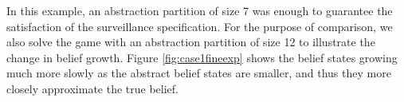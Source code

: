 In this example, an abstraction partition of size 7 was enough to guarantee the satisfaction of the surveillance specification.  For the purpose of comparison, we also solve the game with  an abstraction partition of size 12  to illustrate the change in belief growth. Figure \ref{fig:case1fineexp} shows the belief states growing much more slowly as the abstract belief states are smaller, and thus they more closely  approximate the true belief.
\begin{figure}

	\begin{minipage}{1.0\columnwidth}
		\centering
	\end{minipage}
	\begin{minipage}{1\columnwidth}
		\centering
\end{minipage}
\end{figure}
